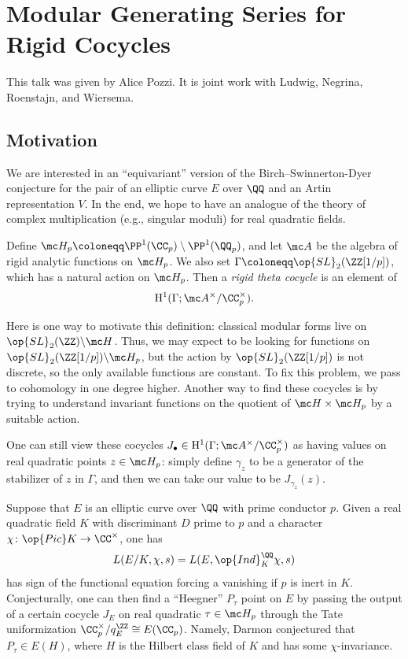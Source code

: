 \documentclass{article}
\begin{document}
\section{Modular Generating Series for Rigid Cocycles}
This talk was given by Alice Pozzi. It is joint work with Ludwig, Negrina, Roenstajn, and Wiersema.

\subsection{Motivation}
We are interested in an ``equivariant'' version of the Birch--Swinnerton-Dyer conjecture for the pair of an elliptic curve $E$ over $\QQ$ and an Artin representation $V$. In the end, we hope to have an analogue of the theory of complex multiplication (e.g., singular moduli) for real quadratic fields.
\begin{definition}
	Define $\mc H_p\coloneqq\PP^1(\CC_p)\setminus\PP^1(\QQ_p)$, and let $\mc A$ be the algebra of rigid analytic functions on $\mc H_p$. We also set $\Gamma\coloneqq\op{SL}_2(\ZZ[1/p])$, which has a natural action on $\mc H_p$. Then a \textit{rigid theta cocycle} is an element of
	\[\mathrm H^1(\Gamma;\mc A^\times/\CC_p^\times).\]
\end{definition}
\begin{remark}
	Here is one way to motivate this definition: classical modular forms live on $\op{SL}_2(\ZZ)\backslash\mc H$. Thus, we may expect to be looking for functions on $\op{SL}_2(\ZZ[1/p])\backslash\mc H_p$, but the action by $\op{SL}_2(\ZZ[1/p])$ is not discrete, so the only available functions are constant. To fix this problem, we pass to cohomology in one degree higher. Another way to find these cocycles is by trying to understand invariant functions on the quotient of $\mc H\times\mc H_p$ by a suitable action.
\end{remark}
\begin{remark}
	One can still view these cocycles $J_\bullet\in\mathrm H^1(\Gamma;\mc A^\times/\CC_p^\times)$ as having values on real quadratic points $z\in\mc H_p$: simply define $\gamma_z$ to be a generator of the stabilizer of $z$ in $\Gamma$, and then we can take our value to be $J_{\gamma_z}(z)$.
\end{remark}
\begin{remark}
	Suppose that $E$ is an elliptic curve over $\QQ$ with prime conductor $p$. Given a real quadratic field $K$ with discriminant $D$ prime to $p$ and a character $\chi\colon\op{Pic}K\to\CC^\times$, one has
	\[L(E/K,\chi,s)=L(E,\op{Ind}_K^\QQ\chi,s)\]
	has sign of the functional equation forcing a vanishing if $p$ is inert in $K$. Conjecturally, one can then find a ``Heegner'' $P_\tau$ point on $E$ by passing the output of a certain cocycle $J_E$ on real quadratic $\tau\in\mc H_p$ through the Tate uniformization $\CC_p^\times/q_E^\ZZ\cong E(\CC_p)$. Namely, Darmon conjectured that $P_\tau\in E(H)$, where $H$ is the Hilbert class field of $K$ and has some $\chi$-invariance.
\end{remark}
\end{document}
